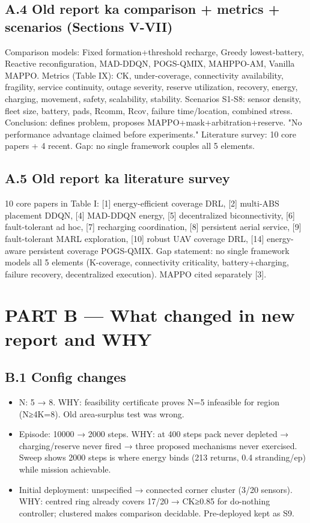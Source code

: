 \documentclass[10pt]{article}
\begin{document}
\subsection{A.4 Old report ka comparison + metrics + scenarios (Sections V-VII)}
Comparison models: Fixed formation+threshold recharge, Greedy lowest-battery, Reactive reconfiguration, MAD-DDQN, POGS-QMIX, MAHPPO-AM, Vanilla MAPPO. Metrics (Table IX): CK, under-coverage, connectivity availability, fragility, service continuity, outage severity, reserve utilization, recovery, energy, charging, movement, safety, scalability, stability. Scenarios S1-S8: sensor density, fleet size, battery, pads, Rcomm, Rcov, failure time/location, combined stress. Conclusion: defines problem, proposes MAPPO+mask+arbitration+reserve. "No performance advantage claimed before experiments." Literature survey: 10 core papers + 4 recent. Gap: no single framework couples all 5 elements.

\subsection{A.5 Old report ka literature survey}
10 core papers in Table I: [1] energy-efficient coverage DRL, [2] multi-ABS placement DDQN, [4] MAD-DDQN energy, [5] decentralized biconnectivity, [6] fault-tolerant ad hoc, [7] recharging coordination, [8] persistent aerial service, [9] fault-tolerant MARL exploration, [10] robust UAV coverage DRL, [14] energy-aware persistent coverage POGS-QMIX. Gap statement: no single framework models all 5 elements (K-coverage, connectivity criticality, battery+charging, failure recovery, decentralized execution). MAPPO cited separately [3].

\section{PART B --- What changed in new report and WHY}

\subsection{B.1 Config changes}
\begin{itemize}
\item N: 5 → 8. WHY: feasibility certificate proves N=5 infeasible for region (N≥4K=8). Old area-surplus test was wrong.
\item Episode: 10000 → 2000 steps. WHY: at 400 steps pack never depleted → charging/reserve never fired → three proposed mechanisms never exercised. Sweep shows 2000 steps is where energy binds (213 returns, 0.4 stranding/ep) while mission achievable.
\item Initial deployment: unspecified → connected corner cluster (3/20 sensors). WHY: centred ring already covers 17/20 → CK≥0.85 for do-nothing controller; clustered makes comparison decidable. Pre-deployed kept as S9.
\end{itemize}
\end{document}
